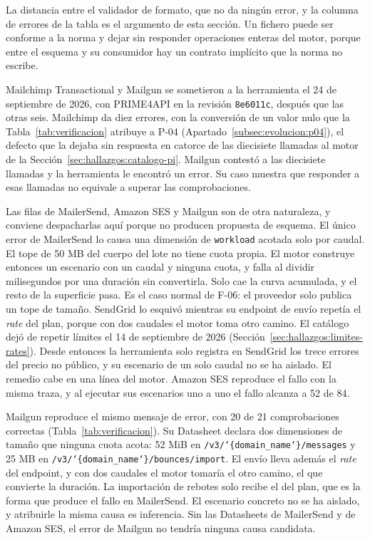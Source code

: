 La distancia entre el validador de formato, que no da ningún error, y la columna de errores de la tabla es el argumento de esta sección.
Un fichero puede ser conforme a la norma y dejar sin responder operaciones enteras del motor, porque entre el esquema y su consumidor hay un contrato implícito que la norma no escribe.

Mailchimp Transactional y Mailgun se sometieron a la herramienta el 24 de septiembre de 2026, con PRIME4API en la revisión \texttt{8e6011c}, después que las otras seis.
Mailchimp da diez errores, con la conversión de un valor nulo que la Tabla~\ref{tab:verificacion} atribuye a P-04 (Apartado~\ref{subsec:evolucion:p04}), el defecto que la dejaba sin respuesta en catorce de las diecisiete llamadas al motor de la Sección~\ref{sec:hallazgos:catalogo-pi}.
Mailgun contestó a las diecisiete llamadas y la herramienta le encontró un error.
Su caso muestra que responder a esas llamadas no equivale a superar las comprobaciones.

Las filas de MailerSend, Amazon SES y Mailgun son de otra naturaleza, y conviene despacharlas aquí porque no producen propuesta de esquema.
El único error de MailerSend lo causa una dimensión de \texttt{workload} acotada solo por caudal.
El tope de 50 MB del cuerpo del lote no tiene cuota propia.
El motor construye entonces un escenario con un caudal y ninguna cuota, y falla al dividir milisegundos por una duración sin convertirla.
Solo cae la curva acumulada, y el resto de la superficie pasa.
Es el caso normal de F-06: el proveedor solo publica un tope de tamaño.
SendGrid lo esquivó mientras su endpoint de envío repetía el \textit{rate} del plan, porque con dos caudales el motor toma otro camino.
El catálogo dejó de repetir límites el 14 de septiembre de 2026 (Sección~\ref{sec:hallazgos:limites-rates}).
Desde entonces la herramienta solo registra en SendGrid los trece errores del precio no público, y su escenario de un solo caudal no se ha aislado.
El remedio cabe en una línea del motor.
Amazon SES reproduce el fallo con la misma traza, y al ejecutar sus escenarios uno a uno el fallo alcanza a 52 de 84.

Mailgun reproduce el mismo mensaje de error, con 20 de 21 comprobaciones correctas (Tabla~\ref{tab:verificacion}).
Su Datasheet declara dos dimensiones de tamaño que ninguna cuota acota: 52 MiB en \texttt{/v3/\allowbreak\char`\{domain\_name\char`\}/\allowbreak messages} y 25 MB en \texttt{/v3/\allowbreak\char`\{domain\_name\char`\}/\allowbreak bounces/\allowbreak import}.
El envío lleva además el \textit{rate} del endpoint, y con dos caudales el motor tomaría el otro camino, el que convierte la duración.
La importación de rebotes solo recibe el del plan, que es la forma que produce el fallo en MailerSend.
El escenario concreto no se ha aislado, y atribuirle la misma causa es inferencia.
Sin las Datasheets de MailerSend y de Amazon SES, el error de Mailgun no tendría ninguna causa candidata.

